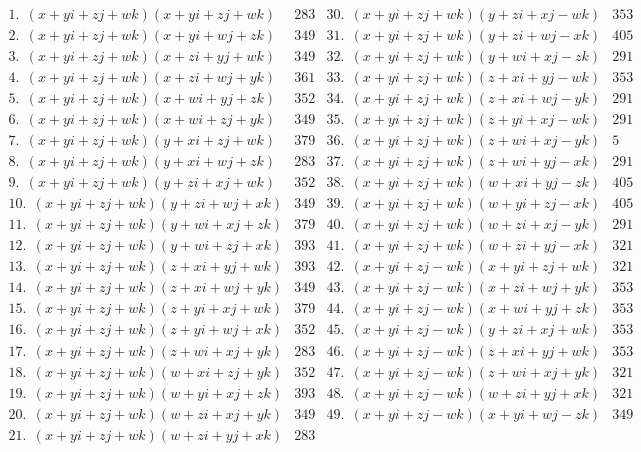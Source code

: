 \documentclass[12pt,table]{article}
\theoremstyle{definition}
\theoremstyle{remark}
\numberwithin{equation}{section}
\begin{document}
\begin{appendices}
\begin{figure}
\[
\begin{array}{l|c||l|c}
1.\:\: (x+yi+zj+wk)(x+yi+zj+wk) &283&
30. \:\: (x+yi+zj+wk)(y+zi+xj-wk) &353\\
%
2. \:\: (x+yi+zj+wk)(x+yi+wj+zk) &349&
31. \:\: (x+yi+zj+wk)(y+zi+wj-xk) &405\\
%
3. \:\: (x+yi+zj+wk)(x+zi+yj+wk) &349&
32. \:\: (x+yi+zj+wk)(y+wi+xj-zk) &291\\
%
4. \:\: (x+yi+zj+wk)(x+zi+wj+yk) &361&
33. \:\: (x+yi+zj+wk)(z+xi+yj-wk) &353\\
%
5. \:\: (x+yi+zj+wk)(x+wi+yj+zk) &352&
34. \:\: (x+yi+zj+wk)(z+xi+wj-yk) &291\\[2mm]
%
6. \:\: (x+yi+zj+wk)(x+wi+zj+yk) &349&
35. \:\: (x+yi+zj+wk)(z+yi+xj-wk) &291\\
%
7. \:\: (x+yi+zj+wk)(y+xi+zj+wk) &379&
36. \:\: (x+yi+zj+wk)(z+wi+xj-yk) &5\\
%
8. \:\: (x+yi+zj+wk)(y+xi+wj+zk) &283&
37. \:\: (x+yi+zj+wk)(z+wi+yj-xk) &291\\
%
9. \:\: (x+yi+zj+wk)(y+zi+xj+wk) &352&
38. \:\: (x+yi+zj+wk)(w+xi+yj-zk) &405\\
%
10. \:\: (x+yi+zj+wk)(y+zi+wj+xk) &349&
39. \:\: (x+yi+zj+wk)(w+yi+zj-xk) &405\\[2mm]
%
11. \:\: (x+yi+zj+wk)(y+wi+xj+zk) &379&
40. \:\: (x+yi+zj+wk)(w+zi+xj-yk) &291\\
%
12. \:\: (x+yi+zj+wk)(y+wi+zj+xk) &393&
41. \:\: (x+yi+zj+wk)(w+zi+yj-xk) &321\\
%
13. \:\: (x+yi+zj+wk)(z+xi+yj+wk) &393&
42. \:\: (x+yi+zj-wk)(x+yi+zj+wk) &321\\
%
14. \:\: (x+yi+zj+wk)(z+xi+wj+yk) &349&
43. \:\: (x+yi+zj-wk)(x+zi+wj+yk) &353\\
%
15. \:\: (x+yi+zj+wk)(z+yi+xj+wk) &379&
44. \:\: (x+yi+zj-wk)(x+wi+yj+zk) &353\\[2mm]
%
16. \:\: (x+yi+zj+wk)(z+yi+wj+xk) &352&
45. \:\: (x+yi+zj-wk)(y+zi+xj+wk) &353\\
%
17. \:\: (x+yi+zj+wk)(z+wi+xj+yk) &283&
46. \:\: (x+yi+zj-wk)(z+xi+yj+wk) &353\\
%
18. \:\: (x+yi+zj+wk)(w+xi+zj+yk) &352&
47. \:\: (x+yi+zj-wk)(z+wi+xj+yk) &321\\
%
19. \:\: (x+yi+zj+wk)(w+yi+xj+zk) &393&
48. \:\: (x+yi+zj-wk)(w+zi+yj+xk) &321\\
%
20. \:\: (x+yi+zj+wk)(w+zi+xj+yk) &349&
49. \:\: (x+yi+zj-wk)(x+yi+wj-zk) &349\\ [2mm]
%
21. \:\: (x+yi+zj+wk)(w+zi+yj+xk) &283&

\end{array}\]
\end{figure}
\end{appendices}
\end{document}

